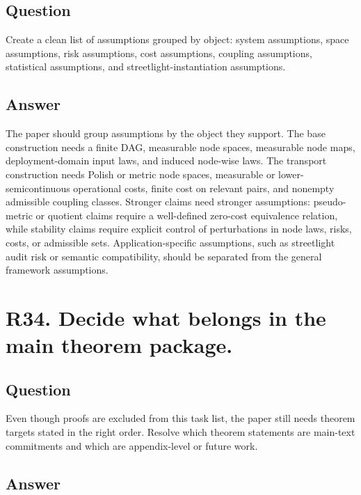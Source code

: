\documentclass[11pt,a4paper]{article}
\begin{document}
\subsection*{Question}

Create a clean list of assumptions grouped by object: system assumptions, space assumptions, risk assumptions, cost assumptions, coupling assumptions, statistical assumptions, and streetlight-instantiation assumptions.

\subsection*{Answer}

The paper should group assumptions by the object they support. The base construction needs a finite DAG, measurable node spaces, measurable node maps, deployment-domain input laws, and induced node-wise laws. The transport construction needs Polish or metric node spaces, measurable or lower-semicontinuous operational costs, finite cost on relevant pairs, and nonempty admissible coupling classes. Stronger claims need stronger assumptions: pseudo-metric or quotient claims require a well-defined zero-cost equivalence relation, while stability claims require explicit control of perturbations in node laws, risks, costs, or admissible sets. Application-specific assumptions, such as streetlight audit risk or semantic compatibility, should be separated from the general framework assumptions.

\section*{R34. Decide what belongs in the main theorem package.}

\subsection*{Question}

Even though proofs are excluded from this task list, the paper still needs theorem targets stated in the right order. Resolve which theorem statements are main-text commitments and which are appendix-level or future work.

\subsection*{Answer}
\end{document}
